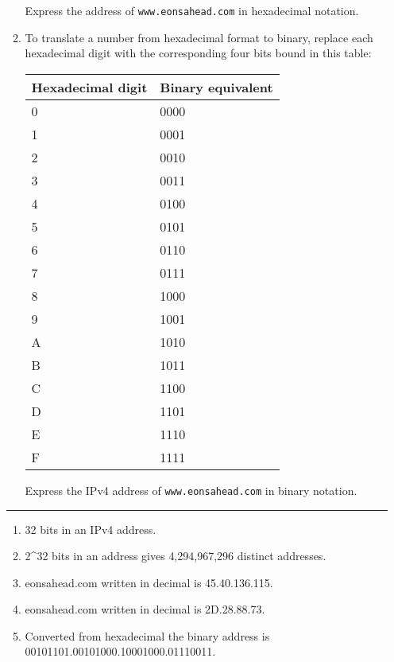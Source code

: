 \documentclass[twoside]{article}
\newenvironment{answer}
  {\vspace*{0.2cm} \rule{12cm}{0.04cm} \vspace*{0.2cm}}
  {\vspace*{0.2cm}}
\begin{document}
\begin{enumerate}
\begin{enumerate}
\begin{itemize}
      \end{itemize}

      Express the address of \verb+www.eonsahead.com+ in hexadecimal
      notation.

    \item To translate a number from hexadecimal format to binary,
      replace each hexadecimal digit with the corresponding
      four bits bound in this table:

      \begin{tabular}{l|l}
        \textbf{Hexadecimal digit} & \textbf{Binary equivalent} \\ \hline
        0 & 0000 \\
        1 & 0001 \\
        2 & 0010 \\
        3 & 0011 \\
        4 & 0100 \\
        5 & 0101 \\
        6 & 0110 \\
        7 & 0111 \\
        8 & 1000 \\
        9 & 1001 \\
        A & 1010 \\
        B & 1011 \\
        C & 1100 \\
        D & 1101 \\
        E & 1110 \\
        F & 1111 \\
        \end{tabular}

      Express the IPv4 address of \verb+www.eonsahead.com+ in binary
      notation.
 
    \end{enumerate}

  \begin{answer}

  \begin{enumerate}
    \item 32 bits in an IPv4 address.
    \item 2^32 bits in an address gives 4,294,967,296 distinct addresses.
    \item eonsahead.com written in decimal is 45.40.136.115.
    \item eonsahead.com written in decimal is 2D.28.88.73.
    \item Converted from hexadecimal the binary address is 00101101.00101000.10001000.01110011.
    \end{enumerate}


\end{answer}
\end{enumerate}
\end{document}

